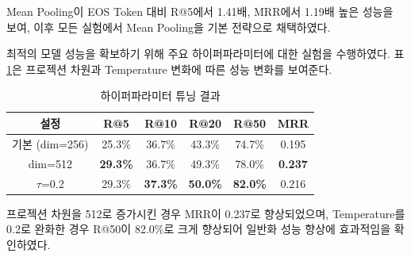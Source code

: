 Mean Pooling이 EOS Token 대비 R@5에서 1.41배, MRR에서 1.19배 높은 성능을 보여, 이후 모든 실험에서 Mean Pooling을 기본 전략으로 채택하였다.

최적의 모델 성능을 확보하기 위해 주요 하이퍼파라미터에 대한 실험을 수행하였다. 표 \ref{tab:tuning}은 프로젝션 차원과 Temperature 변화에 따른 성능 변화를 보여준다.

\begin{table}[h]
\centering
\caption{하이퍼파라미터 튜닝 결과}
\label{tab:tuning}
\begin{tabular}{cccccc}
\toprule
\textbf{설정} & \textbf{R@5} & \textbf{R@10} & \textbf{R@20} & \textbf{R@50} & \textbf{MRR} \\
\midrule
기본 (dim=256) & 25.3\% & 36.7\% & 43.3\% & 74.7\% & 0.195 \\
dim=512 & \textbf{29.3\%} & 36.7\% & 49.3\% & 78.0\% & \textbf{0.237} \\
$\tau$=0.2 & 29.3\% & \textbf{37.3\%} & \textbf{50.0\%} & \textbf{82.0\%} & 0.216 \\
\bottomrule
\end{tabular}
\end{table}

프로젝션 차원을 512로 증가시킨 경우 MRR이 0.237로 향상되었으며, Temperature를 0.2로 완화한 경우 R@50이 82.0\%로 크게 향상되어 일반화 성능 향상에 효과적임을 확인하였다.
